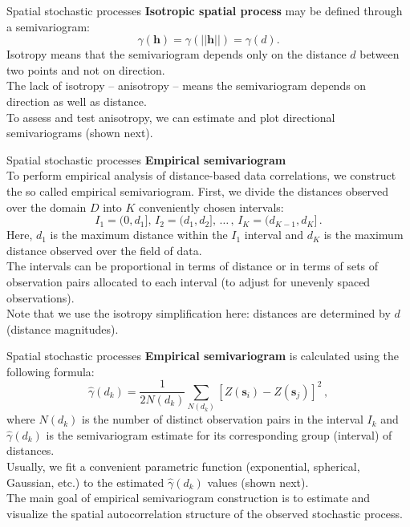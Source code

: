 \documentclass{beamer}
\begin{document}
\begin{frame}{Spatial stochastic processes}
\textbf{Isotropic spatial process} may be defined through a semivariogram:\\  $$\gamma(\bm{h})=\gamma(||\bm{h}||)=\gamma(d).$$ 
Isotropy means that the semivariogram depends only on the distance $d$ between two points and not on direction.\\ \medskip The lack of isotropy -- anisotropy -- means the semivariogram depends on direction as well as distance. \\ \medskip To assess and test anisotropy, we can estimate and plot directional semivariograms (shown next).
\end{frame}
\begin{frame}{Spatial stochastic processes}
\textbf{Empirical semivariogram} \\
To perform empirical analysis of distance-based data correlations, we construct the so called empirical semivariogram. First, we divide the distances observed over the domain $D$ into $K$ conveniently chosen intervals: 
$$I_1 = (0, d_1 ], \, I_2 = (d_1, d_2 ], \, \dots \, , \, I_K = (d_{K-1}, d_K ] \, .$$
Here, $d_1$ is the maximum distance within the $I_1$ interval and $d_K$ is the maximum distance observed over the field of data. \\ \smallskip The intervals can be proportional in terms of distance or in terms of sets of observation pairs allocated to each interval (to adjust for unevenly spaced observations). \\ \smallskip Note that we use the isotropy simplification here: distances are determined by $d$ (distance magnitudes).
\end{frame}
\begin{frame}{Spatial stochastic processes}
\textbf{Empirical semivariogram} is calculated using the following formula:
\begin{equation*}
\hat{\gamma}(d_k) = 
\frac{1}{2N(d_k)} \sum_{N(d_k)}[Z(\bm{s}_i)-Z(\bm{s}_j)]^2 \,,
\end{equation*}
where $N(d_k)$ is the number of distinct observation pairs in the interval $I_k$ and $\hat{\gamma}(d_k)$ is the semivariogram estimate for its corresponding group (interval) of distances. \\
\bigskip
Usually, we fit a convenient parametric function (exponential, spherical, Gaussian, etc.) to the estimated $\hat{\gamma}(d_k)$ values (shown next). \\ 
\bigskip
The main goal of empirical semivariogram construction is to estimate and visualize the spatial autocorrelation structure of the observed stochastic process.
\end{frame}
\end{document}
